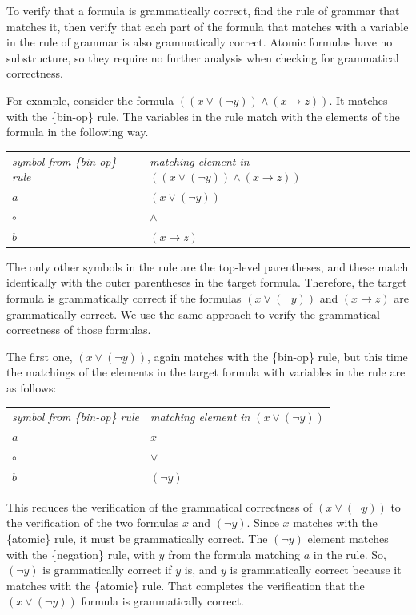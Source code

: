 To verify that a formula is grammatically correct, 
find the rule of grammar that matches it, 
then verify that each part of the formula 
that matches with a variable in the rule of grammar 
is also grammatically correct. 
Atomic formulas have no substructure, 
so they require no further analysis when checking for grammatical correctness.

For example, consider the formula 
$((x \vee (\neg y)) \wedge (x \rightarrow z))$. 
It matches with the \{bin-op\} rule. 
The variables in the rule match 
with the elements of the formula in the following way.
\begin{center}
\begin{tabular}{ll}
\emph{symbol from \{bin-op\} rule}      & \emph{matching element in} $((x \vee (\neg y)) \wedge (x \rightarrow z))$ \\
$a$                                     & $(x \vee (\neg y))$ \\
$\circ$                                 & $\wedge$ \\
$b$                                     & $(x \rightarrow z)$ \\
\end{tabular}
\end{center}

The only other symbols in the rule are the top-level parentheses, and these match identically with the outer parentheses in the target formula. Therefore, the target formula is grammatically correct if the formulas $(x \vee (\neg y))$ and $(x \rightarrow z)$  are grammatically correct. We use the same approach to verify the grammatical correctness of those formulas.

The first one, $(x \vee (\neg y))$, 
again matches with the \{bin-op\} rule,
but this time the matchings of the elements 
in the target formula with variables in the rule are as follows:
\begin{center}
\begin{tabular}{ll}
\emph{symbol from \{bin-op\} rule}      & \emph{matching element in}  $(x \vee (\neg y))$ \\
$a$                                     & $x$ \\
$\circ$                                 & $\vee$ \\
$b$                                     & $(\neg y)$ \\
\end{tabular}
\end{center}

This reduces the verification of the grammatical correctness of $(x \vee (\neg y))$
to the verification of the two formulas $x$ and $(\neg y)$.
Since $x$ matches with the \{atomic\} rule, it must be grammatically correct.
The $(\neg y)$ element matches with the \{negation\} rule,
with $y$ from the formula matching $a$ in the rule.
So, $(\neg y)$ is grammatically correct if $y$ is,
and $y$ is grammatically correct because it matches with the \{atomic\} rule.
That completes the verification that the $(x \vee (\neg y))$ formula is grammatically correct.


